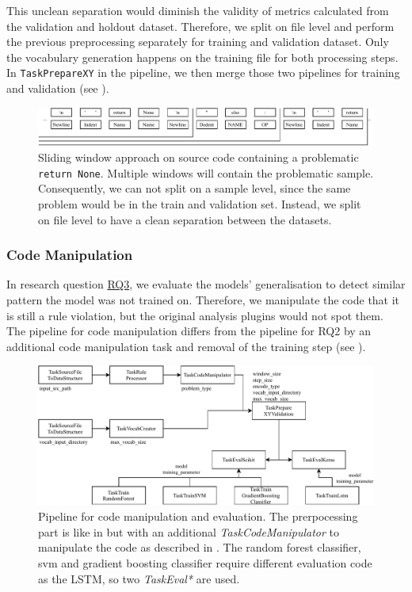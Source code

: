 This unclean separation would diminish the validity of metrics calculated from the validation and holdout dataset. Therefore, we split on file level and perform the previous preprocessing separately for training and validation dataset. Only the vocabulary generation happens on the training file for both processing steps. In \texttt{TaskPrepareXY} in the pipeline, we then merge those two pipelines for training and validation (see ).
\begin{figure}
    \includegraphics[width=1\textwidth]{img/ML/encoding_sliding_window_problem.pdf}
    \caption[Sliding window approach on source code containing a problematic \texttt{return None}]{Sliding window approach on source code containing a problematic \texttt{return None}. Multiple windows will contain the problematic sample. Consequently, we can not split on a sample level, since the same problem would be in the train and validation set. Instead, we split on file level to have a clean separation between the datasets.}
    \label{fig:encoding_sliding_window}
\end{figure}

\subsubsection{Code Manipulation}\label{sec:approach_code_manipulation}
In research question \hyperref[rq:3]{RQ3}, we evaluate the models' generalisation to detect similar pattern the model was not trained on. Therefore, we manipulate the code that it is still a rule violation, but the original analysis plugins would not spot them. The pipeline for code manipulation differs from the pipeline for RQ2 by an additional code manipulation task and removal of the training step (see ).

\begin{figure}
    \includegraphics[width=1\textwidth]{img/ML/Pipeline_RQ3.pdf}
    \caption[Pipeline for code manipulation and evaluation.]{Pipeline for code manipulation and evaluation. The prerpocessing part is like in  but with an additional \textit{TaskCodeManipulator} to manipulate the code as described in . The random forest classifier, svm and gradient boosting classifier require different evaluation code as the LSTM, so two \textit{TaskEval*} are used. }
    \label{fig:pipeline_RQ3}
\end{figure}


